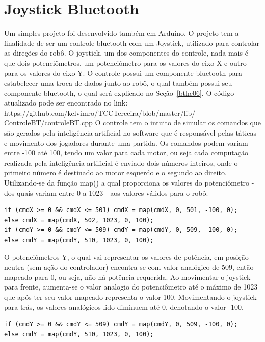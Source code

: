 \documentclass[a4paper,12pt,portuguese]{ufms-cpcx}
\begin{document}
\cleardoublepage
{} 

% 

\appendix
\chapter{Joystick Bluetooth}
Um simples projeto foi desenvolvido também em Arduino. O projeto tem a finalidade de ser um controle bluetooth com um Joystick, utilizado para controlar as direções do robô. 
O joystick, um dos componentes do controle, nada mais é que dois potenciômetros, um potenciômetro para os valores do eixo X e outro para os valores do eixo Y. 
O controle possui um componente bluetooth para estabelecer uma troca de dados junto ao robô, o qual também possui seu componente bluetooth, o qual será explicado no Seção~\ref{bthc06}.
O código atualizado pode ser encontrado no link: https://github.com/kelvimro/TCCTerceira/blob/master/lib/ ControleBT/controleBT.cpp 
O controle tem o intuito de simular os comandos que são gerados pela inteligência artificial no software que é responsável pelas táticas e movimento dos jogadores durante uma partida.
Os comandos podem variam entre -100 até 100, tendo um valor para cada motor, ou seja cada computação realizada pela inteligência artificial é enviado dois números inteiros, onde o primeiro número é destinado ao motor esquerdo e o segundo ao direito.
Utilizando-se da função map() a qual proporciona os valores do potenciômetro - dos quais variam entre 0 a 1023 - aos valores válidos para o robô.

\begin{lstlisting}
if (cmdX >= 0 && cmdX <= 501) cmdX = map(cmdX, 0, 501, -100, 0);
else cmdX = map(cmdX, 502, 1023, 0, 100);
if (cmdY >= 0 && cmdY <= 509) cmdY = map(cmdY, 0, 509, -100, 0);
else cmdY = map(cmdY, 510, 1023, 0, 100);
\end{lstlisting}

O potenciômetros Y, o qual vai representar os valores de potência, em posição neutra (sem ação do controlador) encontra-se com valor analógico de 509, então mapeado para 0, ou seja, não há potência requerida.
Ao movimentar o joystick para frente, aumenta-se o valor analogio do potenciômetro até o máximo de 1023 que após ter seu valor mapeado representa o valor 100.
Movimentando o joystick para trás, os valores analógicos lido diminuem até 0, denotando o valor -100. 
\\
\begin{lstlisting}
if (cmdY >= 0 && cmdY <= 509) cmdY = map(cmdY, 0, 509, -100, 0);
else cmdY = map(cmdY, 510, 1023, 0, 100);
\end{lstlisting}
\end{document}
